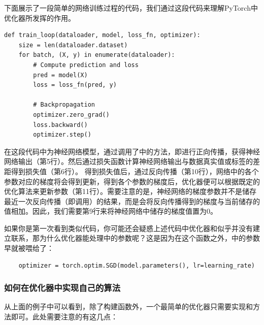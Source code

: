 下面展示了一段简单的网络训练过程的代码，我们通过这段代码来理解PyTorch中优化器所发挥的作用。

\begin{lstlisting}
def train_loop(dataloader, model, loss_fn, optimizer):
    size = len(dataloader.dataset)
    for batch, (X, y) in enumerate(dataloader):
        # Compute prediction and loss
        pred = model(X)
        loss = loss_fn(pred, y)
        
        # Backpropagation
        optimizer.zero_grad()
        loss.backward()
        optimizer.step()
\end{lstlisting}
    
在这段代码中为神经网络模型，通过调用了中的方法，即进行正向传播，获得神经网络输出（第5行）。然后通过损失函数计算神经网络输出与数据真实值或标签的差距得到损失值（第6行）。
得到损失值后，通过反向传播（第10行），网络中的各个参数对应的梯度将会得到更新，得到各个参数的梯度后，优化器便可以根据既定的优化算法来更新参数（第11行）。需要注意的是，神经网络的梯度参数并不是储存最近一次反向传播（即调用）的结果，而是会将反向传播得到的梯度与当前储存的值相加。因此，我们需要第9行来将神经网络中储存的梯度值置为0。

如果你是第一次看到类似代码，你可能还会疑惑上述代码中优化器和似乎并没有建立联系，那为什么优化器能处理中的参数呢？这是因为在这个函数之外，中的参数早就被喂给了：
\begin{lstlisting}
    optimizer = torch.optim.SGD(model.parameters(), lr=learning_rate)
\end{lstlisting}

\subsubsection{如何在优化器中实现自己的算法}

从上面的例子中可以看到，除了构建函数外，一个最简单的优化器只需要实现和方法即可。此处需要注意的有这几点：

